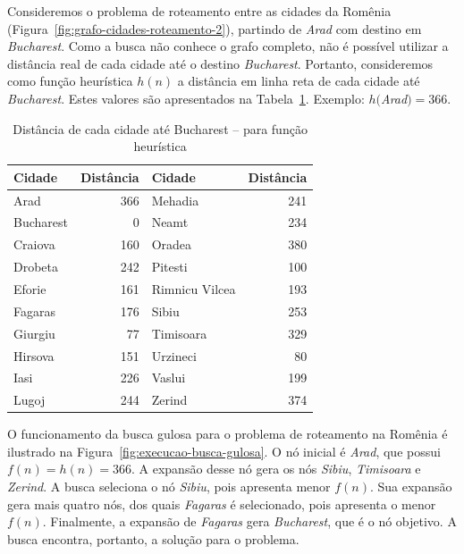 Consideremos o problema de roteamento entre as cidades da Romênia (Figura~\ref{fig:grafo-cidades-roteamento-2}), partindo de \textit{Arad} com destino em \textit{Bucharest}. Como a busca não conhece o grafo completo, não é possível utilizar a distância real de cada cidade até o destino \textit{Bucharest}. Portanto, consideremos como função heurística $h(n)$ a distância em linha reta de cada cidade até \textit{Bucharest}. Estes valores são apresentados na Tabela~\ref{tab:distancias-cidades-bucareste}. Exemplo: $h($\textit{Arad}$) = 366$.

\begin{table}[b!]
	\centering
	\begin{tabular}{lr|lr}
		\hline
		\textbf{Cidade} & \textbf{Distância} & \textbf{Cidade} & \textbf{Distância}\\
		\hline
		Arad & 366 & Mehadia & 241 \\
		Bucharest & 0 & Neamt & 234 \\
		Craiova & 160 & Oradea & 380 \\
		Drobeta & 242 & Pitesti & 100 \\
		Eforie & 161 & Rimnicu Vilcea & 193 \\
		Fagaras & 176 & Sibiu & 253 \\
		Giurgiu & 77 & Timisoara & 329 \\
		Hirsova & 151 & Urzineci & 80 \\
		Iasi & 226 & Vaslui & 199 \\
		Lugoj & 244 & Zerind & 374 \\
		\hline
	\end{tabular}
	
	\caption{Distância de cada cidade até Bucharest -- para função heurística}
	\label{tab:distancias-cidades-bucareste}
\end{table}

O funcionamento da busca gulosa para o problema de roteamento na Romênia é ilustrado na Figura~\ref{fig:execucao-busca-gulosa}. O nó inicial é \textit{Arad}, que possui $f(n) = h(n) = 366$. A expansão desse nó gera os nós \textit{Sibiu}, \textit{Timisoara} e \textit{Zerind}. A busca seleciona o nó \textit{Sibiu}, pois apresenta menor $f(n)$. Sua expansão gera mais quatro nós, dos quais \textit{Fagaras} é selecionado, pois apresenta o menor $f(n)$. Finalmente, a expansão de \textit{Fagaras} gera \textit{Bucharest}, que é o nó objetivo. A busca encontra, portanto, a solução para o problema.

\insertspace

